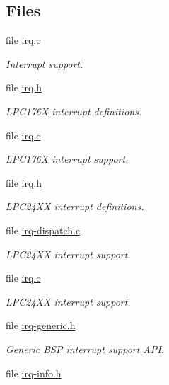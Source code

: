 \subsection*{Files}
\begin{DoxyCompactItemize}
\item 
file \mbox{\hyperlink{bsps_2arm_2beagle_2irq_2irq_8c}{irq.\+c}}
\begin{DoxyCompactList}\small\item\em Interrupt support. \end{DoxyCompactList}\item 
file \mbox{\hyperlink{bsps_2arm_2lpc176x_2include_2bsp_2irq_8h}{irq.\+h}}
\begin{DoxyCompactList}\small\item\em L\+P\+C176X interrupt definitions. \end{DoxyCompactList}\item 
file \mbox{\hyperlink{bsps_2arm_2lpc176x_2irq_2irq_8c}{irq.\+c}}
\begin{DoxyCompactList}\small\item\em L\+P\+C176X interrupt support. \end{DoxyCompactList}\item 
file \mbox{\hyperlink{bsps_2arm_2lpc24xx_2include_2bsp_2irq_8h}{irq.\+h}}
\begin{DoxyCompactList}\small\item\em L\+P\+C24\+XX interrupt definitions. \end{DoxyCompactList}\item 
file \mbox{\hyperlink{irq-dispatch_8c}{irq-\/dispatch.\+c}}
\begin{DoxyCompactList}\small\item\em L\+P\+C24\+XX interrupt support. \end{DoxyCompactList}\item 
file \mbox{\hyperlink{bsps_2arm_2lpc24xx_2irq_2irq_8c}{irq.\+c}}
\begin{DoxyCompactList}\small\item\em L\+P\+C24\+XX interrupt support. \end{DoxyCompactList}\item 
file \mbox{\hyperlink{irq-generic_8h}{irq-\/generic.\+h}}
\begin{DoxyCompactList}\small\item\em Generic B\+SP interrupt support A\+PI. \end{DoxyCompactList}\item 
file \mbox{\hyperlink{irq-info_8h}{irq-\/info.\+h}}

\end{DoxyCompactItemize}
